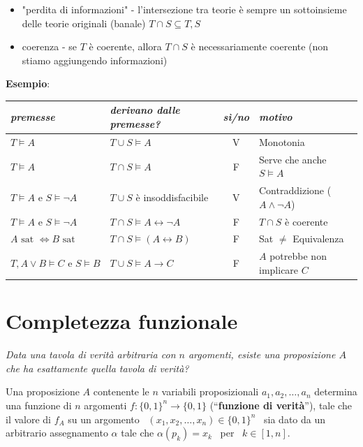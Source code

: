 \documentclass[a4paper,11pt]{report}
\begin{document}
\begin{itemize}
    \item "perdita di informazioni" - l'intersezione tra teorie è sempre un sottoinsieme delle teorie originali (banale)
        \subitem \( T\cap S \subseteq T, S \)
    \item coerenza - se \( T \) è coerente, allora \( T \cap S \) è necessariamente coerente (non stiamo aggiungendo informazioni)
\end{itemize}

\textbf{Esempio}:

\begin{table}[H]
\centering
\begin{tabular}{|l|l|c|l|}
\hline
\textit{premesse} & \textit{derivano dalle premesse?} & \textit{sì/no} & \textit{motivo} \\ \hline
$T \models A$ & $T \cup S \models A$ & V & Monotonia \\ \hline
$T \models A$ & $T \cap S \models A$ & F & Serve che anche $S \models A$ \\ \hline
$T \models A \text{ e } S \models \neg A$ & $T \cup S$ è insoddisfacibile & V & Contraddizione ($A \wedge \neg A$) \\ \hline
$T \models A \text{ e } S \models \neg A$ & $T \cap S \models A \leftrightarrow \neg A$ & F & $T \cap S$ è coerente \\ \hline
$A \text{ sat } \iff B \text{ sat }$ & $T \cap S \models (A \leftrightarrow B)$ & F & Sat $\neq$ Equivalenza \\ \hline
$T, A \lor B \models C \text{ e } S \models B$ & $T \cup S \models A \rightarrow C$ & F & $A$ potrebbe non implicare $C$ \\ \hline
\end{tabular}
\label{tab:teorie}
\end{table}

\section{Completezza funzionale}
\textit{Data una tavola di verità arbitraria con \( n \) argomenti, esiste una proposizione \( A \) che ha esattamente quella tavola di verità?}

Una proposizione \( A \) contenente le \( n \) variabili proposizionali \( a_1, a_2, \dots, a_n \) determina una funzione di \( n \) argomenti \( f: \{0, 1\}^n \to \{0,1\} \) (``\textbf{funzione di verità}''), tale che il valore di \( f_A \) su un argomento \ \( (x_1, x_2, \dots, x_n) \in \{0,1\}^n\) \ sia dato da un arbitrario assegnamento \( \alpha \) tale che \( \alpha(p_k) = x_k\) \ per \ \(k \in [1,n] \).
\end{document}
